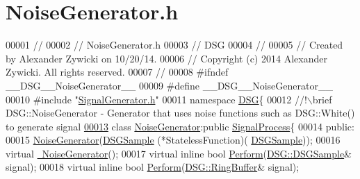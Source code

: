 \hypertarget{_noise_generator_8h_source}{\section{Noise\+Generator.\+h}
\label{_noise_generator_8h_source}
}

\begin{DoxyCode}
00001 \textcolor{comment}{//}
00002 \textcolor{comment}{//  NoiseGenerator.h}
00003 \textcolor{comment}{//  DSG}
00004 \textcolor{comment}{//}
00005 \textcolor{comment}{//  Created by Alexander Zywicki on 10/20/14.}
00006 \textcolor{comment}{//  Copyright (c) 2014 Alexander Zywicki. All rights reserved.}
00007 \textcolor{comment}{//}
00008 \textcolor{preprocessor}{#ifndef \_\_DSG\_\_NoiseGenerator\_\_}
00009 \textcolor{preprocessor}{#define \_\_DSG\_\_NoiseGenerator\_\_}
00010 \textcolor{preprocessor}{#include "\hyperlink{_signal_generator_8h}{SignalGenerator.h}"}
00011 \textcolor{keyword}{namespace }\hyperlink{namespace_d_s_g}{DSG}\{\textcolor{comment}{}
00012 \textcolor{comment}{    //!\(\backslash\)brief DSG::NoiseGenerator - Generator that uses noise functions such as DSG::White() to generate
       signal}
\hypertarget{_noise_generator_8h_source_l00013}{}\hyperlink{class_d_s_g_1_1_noise_generator}{00013} \textcolor{comment}{}    \textcolor{keyword}{class }\hyperlink{class_d_s_g_1_1_noise_generator}{NoiseGenerator}:\textcolor{keyword}{public} \hyperlink{class_d_s_g_1_1_signal_process}{SignalProcess}\{
00014     \textcolor{keyword}{public}:
00015         \hyperlink{class_d_s_g_1_1_noise_generator_ac78b8347da0c0593d495d9d054821c34}{NoiseGenerator}(\hyperlink{namespace_d_s_g_ac39a94cd27ebcd9c1e7502d0c624894a}{DSGSample} (*StatelessFunction)(
      \hyperlink{namespace_d_s_g_ac39a94cd27ebcd9c1e7502d0c624894a}{DSGSample}));
00016         \textcolor{keyword}{virtual} \hyperlink{class_d_s_g_1_1_noise_generator_a964f0af791b5e09e63470bf42ddbce79}{~NoiseGenerator}();
00017         \textcolor{keyword}{virtual} \textcolor{keyword}{inline} \textcolor{keywordtype}{bool} \hyperlink{class_d_s_g_1_1_noise_generator_aa4f8426176cb0d461cbead361288f204}{Perform}(\hyperlink{namespace_d_s_g_ac39a94cd27ebcd9c1e7502d0c624894a}{DSG::DSGSample}& signal);
00018         \textcolor{keyword}{virtual} \textcolor{keyword}{inline} \textcolor{keywordtype}{bool} \hyperlink{class_d_s_g_1_1_noise_generator_aa4f8426176cb0d461cbead361288f204}{Perform}(\hyperlink{class_d_s_g_1_1_ring_buffer}{DSG::RingBuffer}& signal);

\end{DoxyCode}
